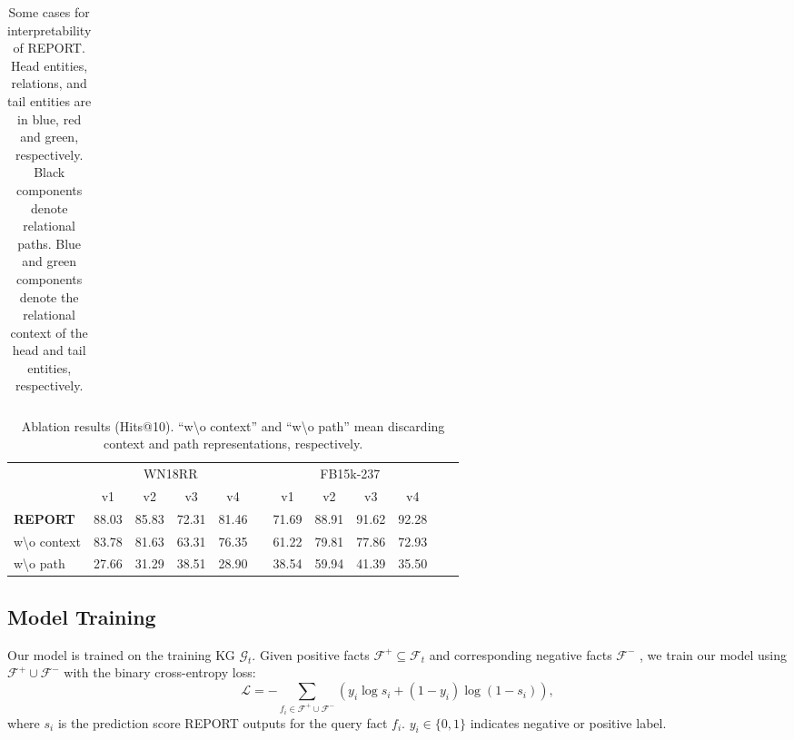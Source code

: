 \documentclass{article}
\begin{document}
\begin{table*}[htb]
\begin{tabular}{clr}
    \bottomrule
    \end{tabular}%
  \label{tab:addlabel}%
  \caption{Some cases for interpretability of REPORT. Head entities, relations, and tail entities are in blue, red and green, respectively. Black components denote relational paths. Blue and green components denote the relational context of the head and tail entities, respectively.}
\end{table*}%

\begin{table}[htb]
\renewcommand\arraystretch{0.2}
\setlength\tabcolsep{1.7pt}
  \centering
  \small
    \begin{tabular}{lccccccccccc}
    \toprule
    \multirow{2}[4]{*}{} & \multicolumn{4}{c}{WN18RR}       &      & \multicolumn{4}{c}{FB15k-237} \\
\cmidrule{2-5}\cmidrule{7-10}         & v1   & v2   & v3   & v4    &      & v1   & v2   & v3   & v4    \\
    \midrule
    \textbf{REPORT} & 88.03 & 85.83 & 72.31 & 81.46  &      & 71.69 & 88.91 & 91.62 & 92.28  \\
    w\textbackslash{}o context & 83.78 & 81.63 & 63.31 & 76.35  &      & 61.22 & 79.81 & 77.86 & 72.93  \\
    w\textbackslash{}o path & 27.66 & 31.29 & 38.51 & 28.90  &      & 38.54 & 59.94 & 41.39 & 35.50  \\
    \bottomrule
    \end{tabular}%
  \label{tab:addlabel}%
  \caption{Ablation results (Hits@10). ``w\textbackslash{}o context'' and ``w\textbackslash{}o path'' mean 
  discarding context and path representations, respectively.}

\end{table}%
 
 
 
 \subsection{Model Training}
 Our model is trained on the training KG $\mathcal{G}_t$. 
 Given positive facts $\mathcal{F}^+\subseteq\mathcal{F}_t$ and corresponding negative facts $\mathcal{F}^-$ 
, we train our model using $\mathcal{F}^+ \cup \mathcal{F}^-$ with the binary cross-entropy loss:
 \begin{equation}
     \mathcal{L}=-\sum_{f_i \in \mathcal{F}^+ \cup \mathcal{F}^-}(y_i\log{s_i}+(1-y_i)\log{(1-s_i)}),
 \end{equation}
 where $s_i$ is the prediction score REPORT outputs for the query fact $f_i$. $y_i\in\{0,1\}$ indicates negative or positive label.
 
\end{document}
